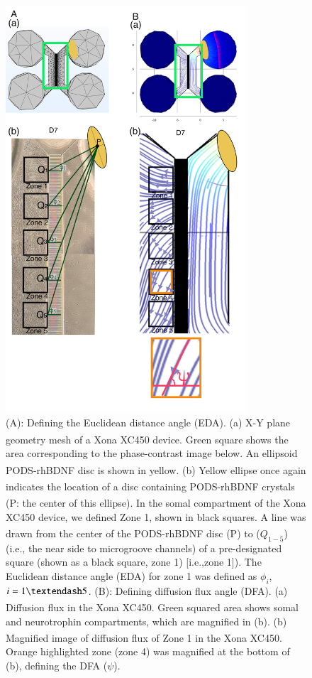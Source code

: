 \documentclass[review]{elsarticle}
\begin{document}
\begin{figure}
	\begin{center}
		\includegraphics[width=9cm]{Fig_75.jpg}
	\end{center}
	\caption{(A): Defining the Euclidean distance angle (EDA). (a) X-Y plane geometry mesh of a Xona\textsuperscript{\texttrademark} XC450 device. Green square shows the area corresponding to the phase-contrast image below. An ellipsoid PODS\textsuperscript{\textregistered}-rhBDNF disc is shown in yellow. (b) Yellow ellipse once again indicates the location of a disc containing PODS\textsuperscript{\textregistered}-rhBDNF crystals (P: the center of this ellipse). In the somal compartment of the Xona\textsuperscript{\texttrademark} XC450 device, we defined Zone 1, shown in black squares. A line was drawn from the center of the PODS\textsuperscript{\textregistered}-rhBDNF disc (P) to ($Q_{1-5}$) (i.e., the near side to microgroove channels) of a pre-designated square (shown as a black square, zone 1) [i.e.,zone 1]). The Euclidean distance angle (EDA) for zone 1 was defined as $\phi_{i}$, $i = 1\textendash 5$. (B): Defining diffusion flux angle (DFA). (a) Diffusion flux in the Xona\textsuperscript{\texttrademark} XC450. Green squared area shows somal and neurotrophin compartments, which are magnified in (b). (b) Magnified image of diffusion flux of Zone 1 in the Xona\textsuperscript{\texttrademark} XC450. Orange highlighted zone (zone 4) was magnified at the bottom of (b), defining the DFA ($\psi$).}
\end{figure}
\end{document}
